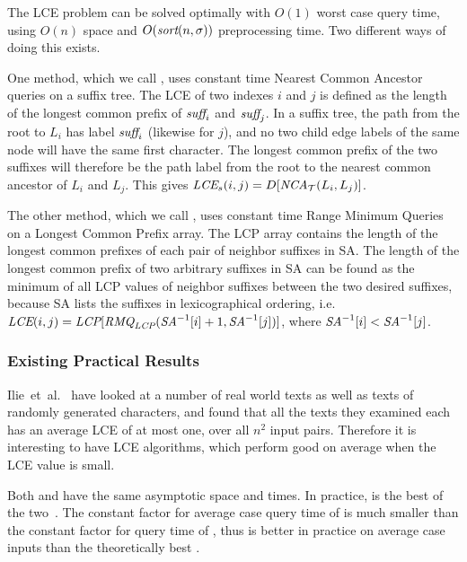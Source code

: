 \documentclass[a4]{article}
\newcommand*{\pref}{\prettyref}
\begin{document}
The LCE problem can be solved optimally with $O(1)$ worst case query time, using $O(n)$ space and $O(\textit{sort}(n,\sigma))$ preprocessing time. Two different ways of doing this exists.

One method, which we call , uses constant time Nearest Common Ancestor queries on a suffix tree. The LCE of two indexes $i$ and $j$ is defined as the length of the longest common prefix of $\textit{suff}_i$ and $\textit{suff}_j$. In a suffix tree, the path from the root to $L_i$ has label $\textit{suff}_i$ (likewise for $j$), and no two child edge labels of the same node will have the same first character. The longest common prefix of the two suffixes will therefore be the path label from the root to the nearest common ancestor of $L_i$ and $L_j$. This gives $\textit{LCE}_s(i,j) = D[\textit{NCA}_\mathcal{T}(L_i,L_j)]$.

The other method, which we call , uses constant time Range Minimum Queries on a Longest Common Prefix array. The LCP array contains the length of the longest common prefixes of each pair of neighbor suffixes in SA. The length of the longest common prefix of two arbitrary suffixes in SA can be found as the minimum of all LCP values of neighbor suffixes between the two desired suffixes, because SA lists the suffixes in lexicographical ordering, i.e. $\textit{LCE}(i,j)=\textit{LCP}[\textit{RMQ}_{\textit{LCP}}(\textit{SA}^{-1}[i] + 1, \textit{SA}^{-1}[j])]$, where $\textit{SA}^{-1}[i] < \textit{SA}^{-1}[j]$. %

\subsubsection{Existing Practical Results}

Ilie~et~al.~\cite{ilie-navarro-tinta} have looked at a number of real world texts as well as texts of randomly generated characters, and found that all the texts they examined each has an average LCE of at most one, over all $n^2$ input pairs. Therefore it is interesting to have LCE algorithms, which perform good on average when the LCE value is small.

Both  and  have the same asymptotic space and times. In practice,  is the best of the two~\cite{ilie-navarro-tinta}. The constant factor for average case query time of  is much smaller than the constant factor for query time of , thus  is better in practice on average case inputs than the theoretically best .
\end{document}
